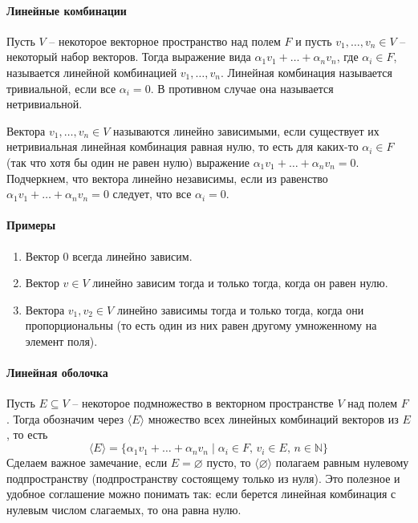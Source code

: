 \paragraph{Линейные комбинации}

Пусть $V$ -- некоторое векторное пространство над полем $F$ и пусть $v_1,\ldots,v_n\in V$ -- некоторый набор векторов.
Тогда выражение вида $\alpha_1 v_1 +\ldots + \alpha_n v_n$, где $\alpha_i\in F$, называется линейной комбинацией $v_1,\ldots,v_n$.
Линейная комбинация называется тривиальной, если все $\alpha_i = 0$.
В противном случае она называется нетривиальной.

Вектора $v_1,\ldots,v_n\in V$ называются линейно зависимыми, если существует их нетривиальная линейная комбинация равная нулю, то есть для каких-то $\alpha_i\in F$ (так что хотя бы один не равен нулю) выражение $\alpha_1 v_1+\ldots + \alpha_n v_n = 0$.
Подчеркнем, что вектора линейно независимы, если из равенство $\alpha_1 v_1 + \ldots + \alpha_n v_n = 0$ следует, что все $\alpha_i = 0$.

\paragraph{Примеры}
\begin{enumerate}
\item Вектор $0$ всегда линейно зависим.

\item Вектор $v\in V$ линейно зависим тогда и только тогда, когда он равен нулю.

\item Вектора $v_1, v_2 \in V$ линейно зависимы тогда и только тогда, когда они пропорциональны (то есть один из них равен другому умноженному на элемент поля).
\end{enumerate}

\paragraph{Линейная оболочка}

Пусть $E\subseteq V$ -- некоторое подмножество в векторном пространстве $V$ над полем $F$.
Тогда обозначим через $\langle E \rangle$ множество всех линейных комбинаций векторов из $E$, то есть
\[
\langle E \rangle = \{\alpha_1 v_1 + \ldots + \alpha_n v_n \mid \alpha_i\in F,\, v_i \in E,\, n\in\mathbb N\}
\]
Сделаем важное замечание, если $E = \varnothing$ пусто, то $\langle \varnothing \rangle$ полагаем равным нулевому подпространству (подпространству состоящему только из нуля).
Это полезное и удобное соглашение можно понимать так: если берется линейная комбинация с нулевым числом слагаемых, то она равна нулю.

